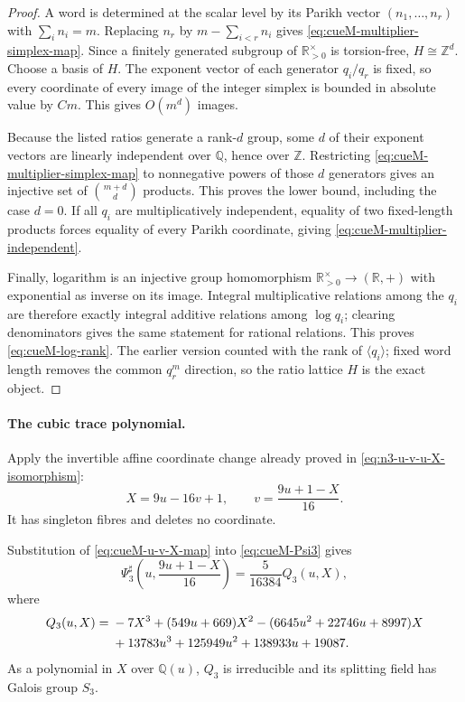 \begin{proof}
A word is determined at the scalar level by its Parikh vector
$(n_1,\ldots,n_r)$ with $\sum_i n_i=m$.  Replacing
$n_r$ by $m-\sum_{i<r}n_i$ gives
\eqref{eq:cueM-multiplier-simplex-map}.  Since a finitely generated subgroup of
$\mathbb R_{>0}^{\times}$ is torsion-free, $H\cong\mathbb Z^d$.  Choose a basis of $H$.
The exponent vector of each generator $q_i/q_r$ is fixed, so every coordinate of every image
of the integer simplex is bounded in absolute value by $Cm$.  This gives $O(m^d)$ images.

Because the listed ratios generate a rank-$d$ group, some $d$ of their exponent vectors are
linearly independent over $\mathbb Q$, hence over $\mathbb Z$.  Restricting
\eqref{eq:cueM-multiplier-simplex-map} to nonnegative powers of those $d$ generators gives
an injective set of $\binom{m+d}{d}$ products.  This proves the lower bound, including the
case $d=0$.  If all $q_i$ are multiplicatively independent, equality of two fixed-length
products forces equality of every Parikh coordinate, giving
\eqref{eq:cueM-multiplier-independent}.

Finally, logarithm is an injective group homomorphism
$\mathbb R_{>0}^{\times}\to(\mathbb R,+)$ with exponential as inverse on its image.
Integral multiplicative relations among the $q_i$ are therefore exactly integral additive
relations among $\log q_i$; clearing denominators gives the same statement for rational
relations.  This proves \eqref{eq:cueM-log-rank}.  The earlier version counted with the rank
of $\langle q_i\rangle$; fixed word length removes the common $q_r^m$ direction, so the
ratio lattice $H$ is the exact object.
\end{proof}

\paragraph{The cubic trace polynomial.}
Apply the invertible affine coordinate change already proved in
\eqref{eq:n3-u-v-u-X-isomorphism}:
\begin{equation}
 X=9u-16v+1,\qquad v=\frac{9u+1-X}{16}.
 \label{eq:cueM-u-v-X-map}
\end{equation}
It has singleton fibres and deletes no coordinate.

\begin{theorem}
\label{thm:cueM-Q3-S3}
Substitution of \eqref{eq:cueM-u-v-X-map} into \eqref{eq:cueM-Psi3} gives
\begin{equation}
 \Psi_3^\sharp\!\left(u,\frac{9u+1-X}{16}\right)
 =\frac5{16384}Q_3(u,X),
 \label{eq:cueM-Q3-transform}
\end{equation}
where
\begin{align}
 Q_3(u,X)={}&-7X^3+(549u+669)X^2
 -(6645u^2+22746u+8997)X\notag\\
 &+13783u^3+125949u^2+138933u+19087.
 \label{eq:cueM-Q3}
\end{align}
As a polynomial in $X$ over $\mathbb Q(u)$, $Q_3$ is irreducible and its splitting field has
Galois group $S_3$.
\end{theorem}

